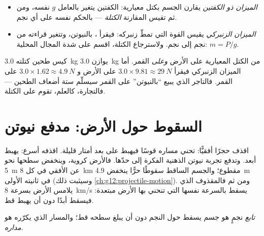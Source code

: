 \begin{method}\label{met:g10:universal-gravitation:instruments}
\begin{itemize}
  \item \emph{الميزان ذو الكفتين} يقارن الجسم بكتل معيارية:
         الكفتين يتغير بالعامل $g$ نفسه، ومن ثم تقيس المقارنة
        \emph{الكتلة} --- بالحكم نفسه على أي نجم.
  \item \emph{الميزان الزنبركي} يقيس القوة التي تمطّ زنبركه:
        فيقرأ \emph{}، بالنيوتن، وتتغير قراءته
        من نجم إلى نجم. ولاسترجاع الكتلة، اقسم على شدة
        المجال المحلية: $m = P/g$.
\end{itemize}
\end{method}

\begin{example}\label{ex:g10:universal-gravitation:flour}
كيس طحين كتلته \qty{3.0}{kg} يوازن \qty{3.0}{kg} من الكتل
المعيارية على الأرض \emph{وعلى} القمر. أما الميزان الزنبركي فيقرأ
$3.0 \times 9.81 \approx \qty{29}{N}$ على الأرض و
$3.0 \times 1.62 \approx \qty{4.9}{N}$ على القمر. فالتاجر الذي يبيع
``بالنيوتن'' على القمر سيسلّم ستة أضعاف الطحين ---
فالتجارة، كالعلم، تقوم على الكتلة.
\end{example}

\section{السقوط حول الأرض: مدفع نيوتن}

اقذف حجرًا أفقيًّا: تحني  مساره قوسًا فيهبط
على بعد أمتار قليلة. اقذفه أسرع: يهبط أبعد. وتدفع تجربة نيوتن
الذهنية الفكرة إلى حدّها. فالأرض كروية، وينخفض
سطحها نحو \qty{5}{m} عن الأفقي في كل
\qty{8}{km} مقطوع؛ والجسم الساقط سقوطًا حرًّا ينخفض \qty{4.9}{m} في
ثانيته الأولى (وسيثبت ذلك \cref{ch:g12:projectile-motion}). ومن ثم فالمقذوف
الذي يلامس الأرض بسرعة \qty{8}{km/s} يسقط بالسرعة نفسها التي
تنحني بها الأرض مبتعدة: فيسقط أبدًا دون أن يهبط قط.

\begin{definition}\label{def:g10:universal-gravitation:satellite}
\emph{تابع} نجمٍ هو جسم يسقط
حول النجم دون أن يبلغ سطحه قط؛ والمسار الذي يكرّره
هو \emph{مداره}.
\end{definition}


